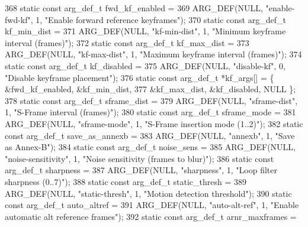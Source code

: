 \begin{DoxyCodeInclude}
{{{{{{{368 \textcolor{keyword}{static} \textcolor{keyword}{const} arg\_def\_t fwd\_kf\_enabled =
369     ARG\_DEF(NULL, \textcolor{stringliteral}{"enable-fwd-kf"}, 1, \textcolor{stringliteral}{"Enable forward reference keyframes"});
370 \textcolor{keyword}{static} \textcolor{keyword}{const} arg\_def\_t kf\_min\_dist =
371     ARG\_DEF(NULL, \textcolor{stringliteral}{"kf-min-dist"}, 1, \textcolor{stringliteral}{"Minimum keyframe interval (frames)"});
372 \textcolor{keyword}{static} \textcolor{keyword}{const} arg\_def\_t kf\_max\_dist =
373     ARG\_DEF(NULL, \textcolor{stringliteral}{"kf-max-dist"}, 1, \textcolor{stringliteral}{"Maximum keyframe interval (frames)"});
374 \textcolor{keyword}{static} \textcolor{keyword}{const} arg\_def\_t kf\_disabled =
375     ARG\_DEF(NULL, \textcolor{stringliteral}{"disable-kf"}, 0, \textcolor{stringliteral}{"Disable keyframe placement"});
376 \textcolor{keyword}{static} \textcolor{keyword}{const} arg\_def\_t *kf\_args[] = \{ &fwd\_kf\_enabled, &kf\_min\_dist,
377                                       &kf\_max\_dist, &kf\_disabled, NULL \};
378 \textcolor{keyword}{static} \textcolor{keyword}{const} arg\_def\_t sframe\_dist =
379     ARG\_DEF(NULL, \textcolor{stringliteral}{"sframe-dist"}, 1, \textcolor{stringliteral}{"S-Frame interval (frames)"});
380 \textcolor{keyword}{static} \textcolor{keyword}{const} arg\_def\_t sframe\_mode =
381     ARG\_DEF(NULL, \textcolor{stringliteral}{"sframe-mode"}, 1, \textcolor{stringliteral}{"S-Frame insertion mode (1..2)"});
382 \textcolor{keyword}{static} \textcolor{keyword}{const} arg\_def\_t save\_as\_annexb =
383     ARG\_DEF(NULL, \textcolor{stringliteral}{"annexb"}, 1, \textcolor{stringliteral}{"Save as Annex-B"});
384 \textcolor{keyword}{static} \textcolor{keyword}{const} arg\_def\_t noise\_sens =
385     ARG\_DEF(NULL, \textcolor{stringliteral}{"noise-sensitivity"}, 1, \textcolor{stringliteral}{"Noise sensitivity (frames to blur)"});
386 \textcolor{keyword}{static} \textcolor{keyword}{const} arg\_def\_t sharpness =
387     ARG\_DEF(NULL, \textcolor{stringliteral}{"sharpness"}, 1, \textcolor{stringliteral}{"Loop filter sharpness (0..7)"});
388 \textcolor{keyword}{static} \textcolor{keyword}{const} arg\_def\_t static\_thresh =
389     ARG\_DEF(NULL, \textcolor{stringliteral}{"static-thresh"}, 1, \textcolor{stringliteral}{"Motion detection threshold"});
390 \textcolor{keyword}{static} \textcolor{keyword}{const} arg\_def\_t auto\_altref =
391     ARG\_DEF(NULL, \textcolor{stringliteral}{"auto-alt-ref"}, 1, \textcolor{stringliteral}{"Enable automatic alt reference frames"});
392 \textcolor{keyword}{static} \textcolor{keyword}{const} arg\_def\_t arnr\_maxframes =
}}}}}}}
\end{DoxyCodeInclude}
